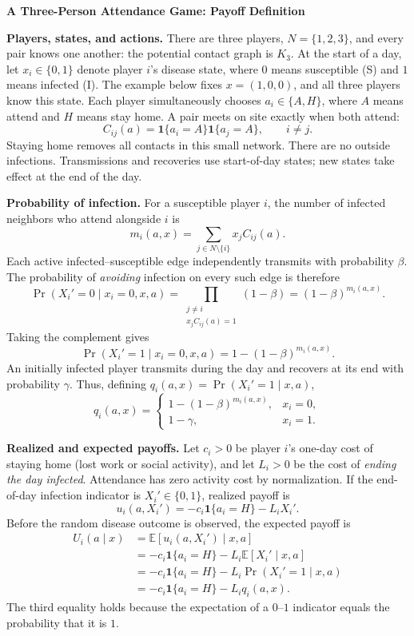 \documentclass[10pt]{article}
\begin{document}
\small
\begin{center}
{\large\bfseries A Three-Person Attendance Game: Payoff Definition}
\end{center}

\textbf{Players, states, and actions.}
There are three players, $N=\{1,2,3\}$, and every pair knows one another:
the potential contact graph is $K_3$. At the start of a day, let
$x_i\in\{0,1\}$ denote player $i$'s disease state, where $0$ means
susceptible (S) and $1$ means infected (I). The example below fixes
$x=(1,0,0)$, and all three players know this state. Each player
simultaneously chooses $a_i\in\{A,H\}$, where $A$ means attend and $H$
means stay home. A pair meets on site exactly when both attend:
\[
C_{ij}(a)=\mathbf{1}\{a_i=A\}\mathbf{1}\{a_j=A\},
\qquad i\ne j.
\]
Staying home removes all contacts in this small network. There are no
outside infections. Transmissions and recoveries use start-of-day
states; new states take effect at the end of the day.

\textbf{Probability of infection.}
For a susceptible player $i$, the number of infected neighbors who
attend alongside $i$ is
\[
m_i(a,x)=\sum_{j\in N\setminus\{i\}} x_j C_{ij}(a).
\]
Each active infected--susceptible edge independently transmits with
probability $\beta$. The probability of \emph{avoiding} infection on
every such edge is therefore
\[
\Pr(X_i'=0\mid x_i=0,x,a)
=\prod_{\substack{j\ne i\\x_jC_{ij}(a)=1}}(1-\beta)
=(1-\beta)^{m_i(a,x)}.
\]
Taking the complement gives
\[
\Pr(X_i'=1\mid x_i=0,x,a)
=1-(1-\beta)^{m_i(a,x)}.
\]
An initially infected player transmits during the day and recovers at
its end with probability $\gamma$. Thus, defining
$q_i(a,x)=\Pr(X_i'=1\mid x,a)$,
\[
q_i(a,x)=
\begin{cases}
1-(1-\beta)^{m_i(a,x)}, & x_i=0,\\
1-\gamma, & x_i=1.
\end{cases}
\]

\textbf{Realized and expected payoffs.}
Let $c_i>0$ be player $i$'s one-day cost of staying home (lost work or
social activity), and let $L_i>0$ be the cost of \emph{ending the day
infected}. Attendance has zero activity cost by normalization. If the
end-of-day infection indicator is $X_i'\in\{0,1\}$, realized payoff is
\[
u_i(a,X_i')=-c_i\mathbf{1}\{a_i=H\}-L_iX_i'.
\]
Before the random disease outcome is observed, the expected payoff is
\begin{align*}
U_i(a\mid x)
&=\mathbb{E}[u_i(a,X_i')\mid x,a]\\
&=-c_i\mathbf{1}\{a_i=H\}-L_i\mathbb{E}[X_i'\mid x,a]\\
&=-c_i\mathbf{1}\{a_i=H\}-L_i\Pr(X_i'=1\mid x,a)\\
&=\boxed{-c_i\mathbf{1}\{a_i=H\}-L_iq_i(a,x)}.
\end{align*}
The third equality holds because the expectation of a $0$--$1$
indicator equals the probability that it is $1$.
\end{document}
